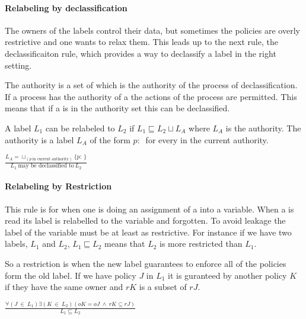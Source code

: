\paragraph{Relabeling by declassification}
The owners of the labels control their data, but sometimes the policies are overly restrictive and one wants to relax them.
This leads up to the next rule, the declassificaiton rule, which provides a way to declassify a label in the right setting.

The authority is a set of \principals{} which is the authority of the process of declassification.
If a process has the authority of a \principal{} the actions of the process are permitted.
This means that if a \principal{} is in the authority set this can be declassified.

A label $L_1$ can be relabeled to $L_2$ if $L_1 \sqsubseteq L_2 \sqcup L_A$ where $L_A$ is the authority.
The authority is a label $L_A$ of the form ${p: \ }$ for every \principal{} in the current authority.

\begin{center}
  $\frac{L_A = \sqcup_{(p \  \mbox{in current authority})}\{p: \ \}}{L_1 \ \mbox{may be declassified to} \ L_2}$
\end{center}

\paragraph{Relabeling by Restriction}
This rule is for when one is doing an assignment of a \xvalue{} into a variable.
When a \xvalue{} is read its label is relabelled to the variable and forgotten.
To avoid leakage the label of the variable must be at least as restrictive.
For instance if we have two labels, $L_1$ and $L_2$, $L_1 \sqsubseteq L_2$ means that $L_2$ is more restricted than $L_1$.

So a restriction is when the new label guarantees to enforce all of the policies form the old label.
If we have policy $J$ in $L_1$ it is guranteed by another policy $K$ if they have the same owner and $rK$ is a subset of $rJ$.
\begin{center}
$\frac{\forall (J \ \in \ L_1) \exists (K \ \in \ L_2)(oK = oJ \ \wedge \ rK \subseteq rJ)}{L_1 \sqsubseteq L_2}$
\end{center}

